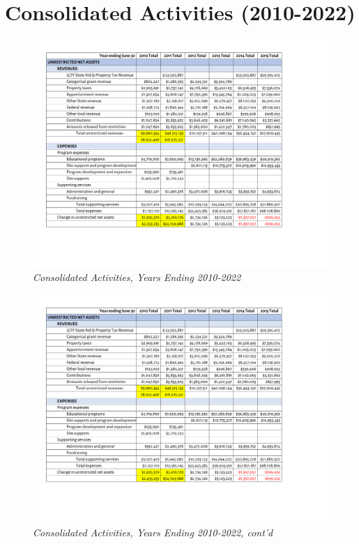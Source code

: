 
\chapter{Consolidated Activities (2010-2022)}\label{ch:consolidated_activities_2010-22}

\begin{figure}
  \caption[Consolidated Activities, Years Ending 2010–2022]{\textit{Consolidated Activities, Years Ending 2010-2022}}\label{fig:consolidated_activities} %
  \includegraphics[page=1,scale=0.9]{Consolidated_Activities_2010-2022} %
\end{figure}

\begin{figure}
  \caption*{\textit{Consolidated Activities, Years Ending 2010-2022, cont'd}} %
  \includegraphics[page=2,scale=0.9]{Consolidated_Activities_2010-2022} %
\end{figure}

